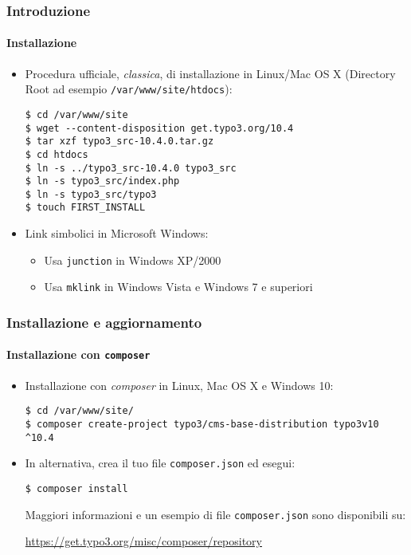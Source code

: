 
\begin{frame}[fragile]
	\frametitle{Introduzione}
	\framesubtitle{Installazione}

	\begin{itemize}
		\item Procedura ufficiale, \textit{classica}, di installazione in Linux/Mac OS X\newline
			(Directory Root ad esempio \texttt{/var/www/site/htdocs}):
\begin{lstlisting}
$ cd /var/www/site
$ wget --content-disposition get.typo3.org/10.4
$ tar xzf typo3_src-10.4.0.tar.gz
$ cd htdocs
$ ln -s ../typo3_src-10.4.0 typo3_src
$ ln -s typo3_src/index.php
$ ln -s typo3_src/typo3
$ touch FIRST_INSTALL
\end{lstlisting}

		\item Link simbolici in Microsoft Windows:

			\begin{itemize}
				\item Usa \texttt{junction} in Windows XP/2000
				\item Usa \texttt{mklink} in Windows Vista e Windows 7 e superiori
			\end{itemize}

	\end{itemize}
\end{frame}


\begin{frame}[fragile]
	\frametitle{Installazione e aggiornamento}
	\framesubtitle{Installazione con \texttt{composer}}

	\begin{itemize}
		\item Installazione con \textit{composer} in Linux, Mac OS X e Windows 10:
\begin{lstlisting}
$ cd /var/www/site/
$ composer create-project typo3/cms-base-distribution typo3v10 ^10.4
\end{lstlisting}

		\item In alternativa, crea il tuo file \texttt{composer.json} ed esegui:
\begin{lstlisting}
$ composer install
\end{lstlisting}

			Maggiori informazioni e un esempio di file \texttt{composer.json} sono disponibili su:\newline

			\small
				\href{https://get.typo3.org/misc/composer/repository}{https://get.typo3.org/misc/composer/repository}
			\normalsize

	\end{itemize}
\end{frame}

